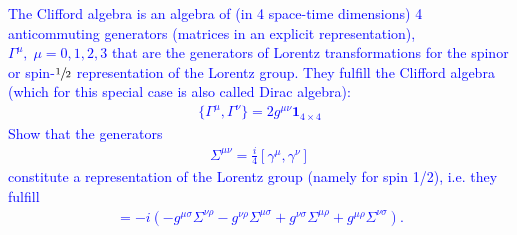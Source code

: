 \documentclass[../main.tex]{subfiles}
\begin{document}
\textcolor{blue}{
The Clifford algebra is an algebra of (in 4 space-time dimensions) 4 anticommuting generators (matrices in an explicit representation), $\Gamma^\mu,\;\mu = 0,1,2,3$
that are the generators of Lorentz transformations for the spinor or spin-$\sfrac{1}{2}$ representation of the Lorentz group. They fulfill the Clifford algebra (which for this special case is also called Dirac algebra):
\begin{align}
\{\Gamma^\mu,\Gamma^\nu\}=2g^{\mu\nu}\mathbf{1}_{4\times4}
\end{align}
Show that the generators
\begin{align}
\Sigma^{\mu\nu}=\frac{i}{4}[\gamma^\mu,\gamma^\nu]
\end{align}
constitute a representation of the Lorentz group (namely for spin 1/2), i.e. they fulfill
\begin{align}
[\Sigma^{\mu\nu},\Sigma^{\rho\sigma}]=
-i(-
g^{\mu\sigma}\Sigma^{\nu\rho}-
g^{\nu\rho}\Sigma^{\mu\sigma}+
g^{\nu\sigma}\Sigma^{\mu\rho}+
g^{\mu\rho}\Sigma^{\nu\sigma}
).
\end{align}
}\newline
\end{document}
